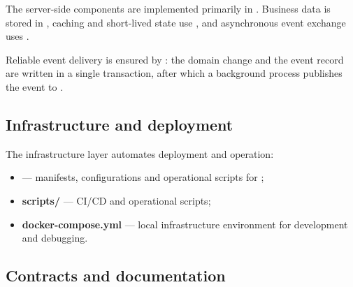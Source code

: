 \documentclass[12pt,a4paper]{extarticle}
\begin{document}
\begin{hseExample}
The server-side components are implemented primarily in . Business data is stored in , caching and short-lived state use , and asynchronous event exchange uses .

Reliable event delivery is ensured by : the domain change and the event record are written in a single transaction, after which a background process publishes the event to .
\end{hseExample}

\subsection{Infrastructure and deployment}

\begin{hseExample}
The infrastructure layer automates deployment and operation:

\begin{itemize}[leftmargin=1.25cm]
    \item \textbf{} --- manifests, configurations and operational scripts for ;
    \item \textbf{scripts/} --- CI/CD and operational scripts;
    \item \textbf{docker-compose.yml} --- local infrastructure environment for development and debugging.
\end{itemize}
\end{hseExample}

\subsection{Contracts and documentation}
\end{document}
